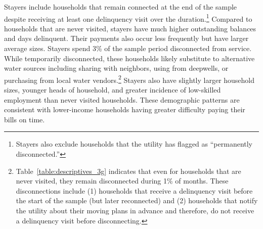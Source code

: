 \documentclass[12pt]{article}
\begin{document}
Stayers include households that remain connected at the end of the sample despite receiving at least one delinquency visit over the duration.\footnote{Stayers also exclude households that the utility has flagged as ``permanently disconnected.''}  Compared to households that are never visited, stayers have much higher outstanding balances and days delinquent.  Their payments also occur less frequently but have larger average sizes.  Stayers spend 3\% of the sample period disconnected from service.  While temporarily disconnected, these households likely substitute to alternative water sources including sharing with neighbors, using from deepwells, or purchasing from local water vendors.\footnote{Table~\ref{table:descriptives_3g} indicates that even for households that are never visited, they remain disconnected during 1\% of months.  These disconnections include (1) households that receive a delinquency visit before the start of the sample (but later reconnected) and (2) households that notify the utility about their moving plans in advance and therefore, do not receive a delinquency visit before disconnecting.}  Stayers also have slightly larger household sizes, younger heads of household, and greater incidence of low-skilled employment than never visited households.  These demographic patterns are consistent with lower-income households having greater difficulty paying their bills on time.
\end{document}
